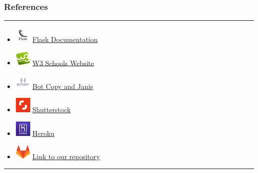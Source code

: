 \documentclass[14pt]{beamer}
\begin{document}
\begin{frame}
	\frametitle{References}
    \noindent
    {\color{pink} \rule{\linewidth}{0.7mm}}
    \begin{itemize}
        \item [] \includegraphics[width=0.3in, height=0.3in]{./Codiac/logos/documentation.png} \href{https://flask.palletsprojects.com/en/1.1.x/} {Flask Documentation}\\
            
        \item [] \includegraphics[width=0.3in, height=0.3in]{./Codiac/logos/w3schools.png} \href{https://www.w3schools.com/} {W3 Schools Website}\\
            \item [] \includegraphics[width=0.3in, height=0.3in]{./Codiac/logos/botcopy.png} \href{https://www.botcopy.com/} {Bot Copy and Janis}\\
                    \item [] \includegraphics[width=0.3in, height=0.3in]{./Codiac/logos/shutter.png} \href{https://www.shutterstock.com/?rid=170336628&gclid=Cj0KCQjwnqH7BRDdARIsACTSAdvbnRVMWw3_B9aDsAxuGgPnMgjnuE9Gdei2Z510VfgXOn-pviSB-YMaAv6vEALw_wcB} {Shutterstock}\\
                    \item [] \includegraphics[width=0.3in, height=0.3in]{./Codiac/logos/heroku.jpg} \href{https://signup.heroku.com/t/platform?c=7013A000000ib1xQAA&gclid=CjwKCAjwh7H7BRBBEiwAPXjadvVFuTYB80whEdGEBINmJF2RsYPX9X7iwQU11dya8QJAOFCxENHdrRoCiaMQAvD_BwE}{Heroku}\\
                     \item [] \includegraphics[width=0.3in, height=0.3in]{./Codiac/logos/gitlab.png} \href{https://gitlab.com/ksaisudha24/Codiac}{Link to our repository}\\
    \end{itemize}
    \noindent
    {\color{pink} \rule{\linewidth}{0.7mm}}
\end{frame}
\end{document}

